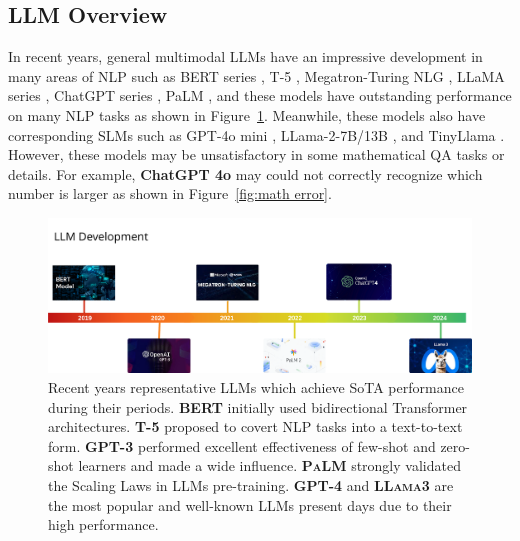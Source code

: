 \documentclass[10pt]{article}
\begin{document}
\subsection{LLM Overview}
In recent years, general multimodal LLMs have an impressive development in many areas of NLP such as BERT series \cite{devlin2019bertpretrainingdeepbidirectional}, T-5 \cite{Raffel2019ExploringTL}, Megatron-Turing NLG \cite{smith2022usingdeepspeedmegatrontrain}, LLaMA series \cite{Touvron2023Llama2O}, ChatGPT series \cite{openai2024gpt4technicalreport}, PaLM \cite{chowdhery2022palmscalinglanguagemodeling}, and these models have outstanding performance on many NLP tasks as shown in Figure~\ref{fig:timeline}. Meanwhile, these models also have corresponding SLMs such as GPT-4o mini \cite{openai_gpt4omini_2024}, LLama-2-7B/13B \cite{touvron2023llamaopenefficientfoundation}, and TinyLlama \cite{zhang2024tinyllamaopensourcesmalllanguage}. However, these models may be unsatisfactory in some mathematical QA tasks or details. For example, \textbf{ChatGPT 4o} may could not correctly recognize which number is larger as shown in Figure~\ref{fig:math error}. 
\begin{figure}[h]
    \centering
    \includegraphics[width=\linewidth]{Figures/LLM timeline.png}
    \caption{Recent years representative LLMs which achieve SoTA performance during their periods. \textbf{\textsc{BERT}} \cite{devlin2019bertpretrainingdeepbidirectional} initially used bidirectional Transformer architectures. \textbf{\textsc{T-5}} \cite{Raffel2019ExploringTL} proposed to covert NLP tasks into a text-to-text form. \textbf{\textsc{GPT-3}} \cite{Brown2020LanguageMA} performed excellent effectiveness of few-shot and zero-shot learners and made a wide influence. \textbf{\textsc{PaLM}} \cite{chowdhery2022palmscalinglanguagemodeling} strongly validated the Scaling Laws in LLMs pre-training. \textbf{\textsc{GPT-4}} \cite{openai2024gpt4technicalreport} and \textbf{\textsc{LLama3}} \cite{dubey2024llama3herdmodels} are the most popular and well-known LLMs present days due to their high performance.}
    \label{fig:timeline}
\end{figure}
\end{document}
